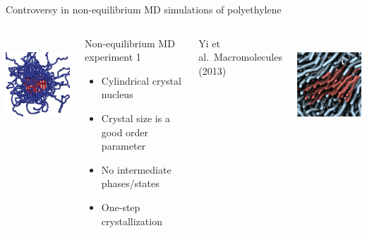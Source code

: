\documentclass[aspectratio=169]{beamer}
\begin{document}
\begin{frame}[c]{Controversy in non-equilibrium MD simulations of polyethylene}
  \vspace{-0.5\baselineskip}

  \begin{columns}[T]


    \centering
    \includegraphics[height=0.5\textwidth]{figs/fig-Rutledge_crystal_crop.pdf}
    \vspace{0.5\baselineskip}

    \begin{block}{Non-equilibrium MD experiment 1}
      \begin{itemize}
        \item Cylindrical crystal nucleus
        \item Crystal size is a good order parameter
        \item No intermediate phases/states
        \item One-step crystallization
      \end{itemize}
    \end{block}

    \vspace{4pt}
    {\small{}Yi et al.~Macromolecules (2013)\par}


    \centering
    \includegraphics[height=0.5\textwidth]{figs/fig-Hall_crystal_crop.pdf}
    \vspace{0.5\baselineskip}


\end{columns}
\end{frame}
\end{document}
